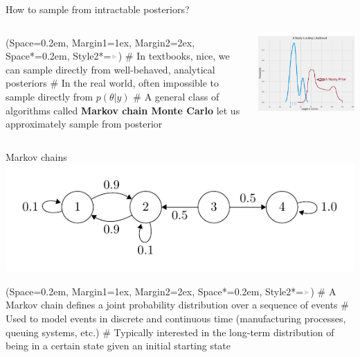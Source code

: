 \documentclass[12pt, aspectratio=149]{beamer}
\newcommand{\listSpace}{0.2em}
\theoremstyle{plain}
\begin{document}
\begin{frame}[fragile]{How to sample from intractable posteriors?}
	\begin{columns}
		\begin{column}{0.5\linewidth}
		\begin{easylist}
			\ListProperties(Space=\listSpace, Margin1=1ex, Margin2=2ex, Space*=\listSpace, Style2*=$\color{bggraydark}\blacktriangleright$\space)
			# In textbooks, nice, we can sample directly from well-behaved, analytical posteriors
			# In the real world, often impossible to sample directly from $p(\theta \vert y)$
			# A general class of algorithms called \textbf{Markov chain Monte Carlo} let us approximately sample from posterior
		\end{easylist}		
		\end{column}
		\begin{column}{0.5\linewidth}
		\includegraphics[scale=0.2]{figs/nasty_prior_posterior_example.png}
		\end{column}
	\end{columns}
\end{frame}

\begin{frame}[fragile]{Markov chains}
	\includegraphics[scale=.8]{figs/irreducible.pdf}
	\begin{easylist}[itemize]
		\ListProperties(Space=\listSpace, Margin1=1ex, Margin2=2ex, Space*=\listSpace, Style2*=$\color{bggraydark}\blacktriangleright$\space)
		# A Markov chain defines a joint probability distribution over a sequence of events
		# Used to model events in discrete and continuous time (manufacturing processes, queuing systems, etc.)
		# Typically interested in the long-term distribution of being in a certain state given an initial starting state
	\end{easylist}
\end{frame}
\end{document}
